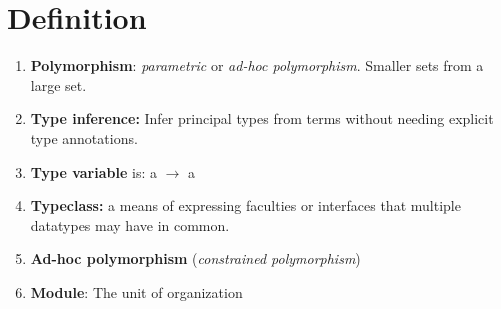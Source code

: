 \documentclass{article}
\newcounter{Def}[section]
\begin{document}
    \section{Definition}
    \begin{multicols}{2}
    \begin{enumerate}
        \item \textbf{Polymorphism}:  \textit{parametric} or \textit{ad-hoc polymorphism}. Smaller sets from a large set.
        \item \textbf{Type inference:} Infer principal types from terms without needing explicit type
            annotations.
        \item \textbf{Type variable} is: {\selectfont a} $\to$ {\selectfont a}
        \item \textbf{Typeclass:} a means of expressing faculties or interfaces that multiple datatypes may have
            in common.
        \item \textbf{Ad-hoc polymorphism} (\textit{constrained polymorphism})
        \item \textbf{Module}: The unit of organization
    \end{enumerate}
    \end{multicols}
\end{document}
